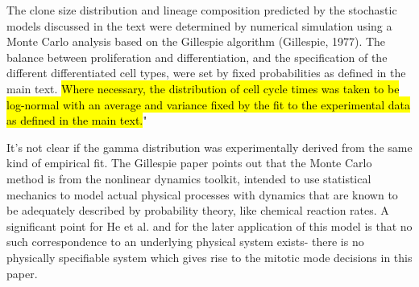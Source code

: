 \documentclass{ut-thesis}
\begin{document}
\bigskip

\begin{longquote}The clone size distribution and lineage composition predicted by the
stochastic models discussed in the text were determined by numerical
simulation using a Monte Carlo analysis based on the Gillespie algorithm
(Gillespie, 1977). The balance between proliferation and differentiation,
and the specification of the different differentiated cell types, were set by
fixed probabilities as defined in the main text.\hl{ Where necessary, the
distribution of cell cycle times was taken to be log-normal with an average
and variance fixed by the fit to the experimental data as defined in the main
text.}"
\end{longquote}

\bigskip

It's not clear if the gamma distribution was experimentally derived from the same kind of empirical fit. The Gillespie paper points out that the Monte Carlo method is from the nonlinear dynamics toolkit, intended to use statistical mechanics to model actual physical processes with dynamics that are known to be adequately described by probability theory, like chemical reaction rates. A significant point for He et al. and for the later application of this model is that no such correspondence to an underlying physical system exists- there is no physically specifiable system which gives rise to the mitotic mode decisions in this paper.

\bigskip
\end{document}
